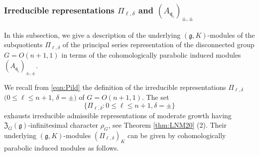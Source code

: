 \subsubsection{Irreducible representations $\Pi_{\ell, \delta}$ and $(A_{\mathfrak{q}_i})_{\pm,\pm}$}

In this subsection,
 we give a description
 of the underlying $({\mathfrak{g}}, K)$-modules
 of the subquotients $\Pi_{\ell,\delta}$
 of the principal series representation
 of the disconnected group $G=O(n+1,1)$
 in terms of the cohomologically parabolic induced modules
 $(A_{\mathfrak{q}_i})_{\pm,\pm}$.  

We recall from \eqref{eqn:Pild} 
 the definition of the irreducible representations 
 $\Pi_{\ell,\delta}$
 $(0 \le \ell \le n+1$, $\delta = \pm)$
 of $G=O(n+1,1)$.  
The set 
\[
\{\Pi_{\ell,\delta}: 0 \le \ell \le n+1, \delta=\pm\}
\]
 exhausts irreducible admissible representations
 of moderate growth 
 having ${\mathfrak{Z}}_G({\mathfrak{g}})$-infinitesimal
 character $\rho_G$, 
 see Theorem \ref{thm:LNM20} (2).  
Their underlying $({\mathfrak{g}},K)$-modules
 $(\Pi_{\ell,\delta})_K$
 can be given by cohomologically parabolic induced modules as follows.  
